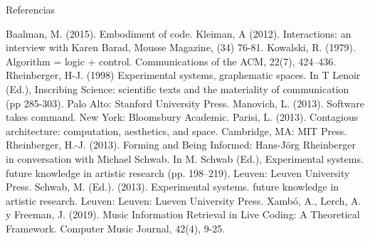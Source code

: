 Referencias

Baalman, M. (2015). Embodiment of code. 
Kleiman, A (2012). Interactions: an interview with Karen Barad, Mousse Magazine, (34) 76-81.
Kowalski, R. (1979). Algorithm = logic + control. Communications of the ACM, 22(7), 424–436.
Rheinberger, H-J. (1998) Experimental systems, graphematic spaces. In T Lenoir (Ed.), Inscribing Science: scientific texts and the materiality of communication (pp 285-303). Palo Alto: Stanford University Press.
Manovich, L. (2013). Software takes command. New York: Bloomsbury Academic.
Parisi, L. (2013). Contagious architecture: computation, aesthetics, and space. Cambridge, MA:
MIT Press.
Rheinberger, H.-J. (2013). Forming and Being Informed: Hans-Jörg Rheinberger in conversation with Michael Schwab. In M. Schwab (Ed.), Experimental systems. future knowledge in artistic research (pp. 198–219). Leuven: Leuven University Press.
Schwab, M. (Ed.). (2013). Experimental systems. future knowledge in artistic research. Leuven: Leuven: Lueven University Press.
Xambó, A., Lerch, A. y Freeman, J. (2019). Music Information Retrieval in Live Coding: A Theoretical Framework. Computer Music Journal, 42(4), 9-25.

